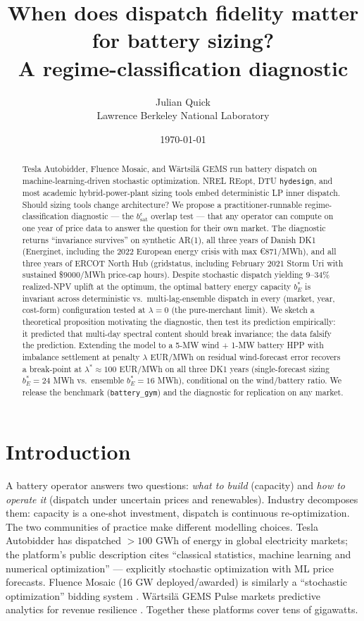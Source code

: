 \documentclass[11pt]{article}
\title{When does dispatch fidelity matter for battery sizing?\\
A regime-classification diagnostic}
\author{Julian Quick \\ \small{Lawrence Berkeley National Laboratory}}
\date{\today}
\begin{document}
\maketitle

\begin{abstract}
Tesla Autobidder, Fluence Mosaic, and W\"{a}rtsil\"{a} GEMS run battery dispatch on machine-learning-driven stochastic optimization. NREL REopt, DTU \texttt{hydesign}, and most academic hybrid-power-plant sizing tools embed deterministic LP inner dispatch. Should sizing tools change architecture? We propose a practitioner-runnable regime-classification diagnostic --- the $b_{\mathrm{sat}}^{\epsilon}$ overlap test --- that any operator can compute on one year of price data to answer the question for their own market. The diagnostic returns ``invariance survives'' on synthetic AR(1), all three years of Danish DK1 (Energinet, including the 2022 European energy crisis with max \euro 871/MWh), and all three years of ERCOT North Hub (gridstatus, including February 2021 Storm Uri with sustained \$9000/MWh price-cap hours). Despite stochastic dispatch yielding $9$--$34\%$ realized-NPV uplift at the optimum, the optimal battery energy capacity $b_E^*$ is invariant across deterministic vs.\ multi-lag-ensemble dispatch in every (market, year, cost-form) configuration tested at $\lambda = 0$ (the pure-merchant limit). We sketch a theoretical proposition motivating the diagnostic, then test its prediction empirically: it predicted that multi-day spectral content should break invariance; the data falsify the prediction. Extending the model to a 5-MW wind + 1-MW battery HPP with imbalance settlement at penalty $\lambda$ EUR/MWh on residual wind-forecast error recovers a break-point at $\lambda^* \approx 100$ EUR/MWh on all three DK1 years (single-forecast sizing $b_E^* = 24$ MWh vs.\ ensemble $b_E^* = 16$ MWh), conditional on the wind/battery ratio. We release the benchmark (\texttt{battery\_gym}) and the diagnostic for replication on any market.
\end{abstract}

\section{Introduction}

A battery operator answers two questions: \emph{what to build} (capacity) and \emph{how to operate it} (dispatch under uncertain prices and renewables). Industry decomposes them: capacity is a one-shot investment, dispatch is continuous re-optimization. The two communities of practice make different modelling choices. Tesla Autobidder has dispatched $>100$ GWh of energy in global electricity markets; the platform's public description \citep{tesla2024autobidder} cites ``classical statistics, machine learning and numerical optimization'' --- explicitly stochastic optimization with ML price forecasts. Fluence Mosaic (16 GW deployed/awarded) is similarly a ``stochastic optimization'' bidding system \citep{fluence2024mosaic}. W\"{a}rtsil\"{a} GEMS Pulse markets predictive analytics for revenue resilience \citep{wartsila2025gems}. Together these platforms cover tens of gigawatts.
\end{document}
